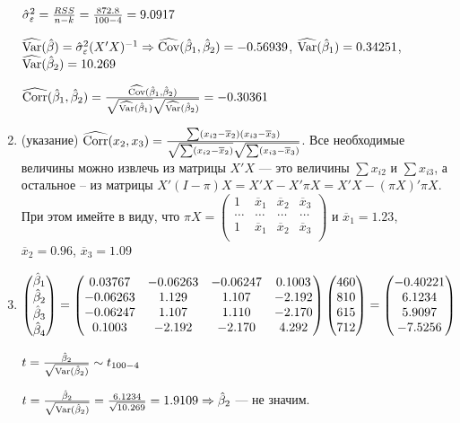 \begin{problem}
\begin{sol}
\begin{enumerate}
$\hat{\sigma}_{\varepsilon}^2 = \frac{RSS}{n-k} = \frac{872.8}{100-4} = 9.0917$

$\widehat{\operatorname{Var}}(\hat{\beta}) = \hat{\sigma}_{\varepsilon}^2 (X' X)^{-1} \Rightarrow \widehat{\operatorname{Cov}}(\hat{\beta}_1, \hat{\beta}_2) = -0.56939$, $\widehat{\operatorname{Var}}(\hat{\beta}_1) = 0.34251$, $\widehat{\operatorname{Var}}(\hat{\beta}_2) = 10.269$

$\widehat{\operatorname{Corr}}(\hat{\beta}_1, \hat{\beta}_2) = \frac{\widehat{\operatorname{Cov}}(\hat{\beta}_1, \hat{\beta}_2)}{\sqrt{\widehat{\operatorname{Var}}(\hat{\beta}_1)}\sqrt{\widehat{\operatorname{Var}}(\hat{\beta}_2)}} = -0.30361$

\item(указание) $\widehat{\operatorname{Corr}}(x_2, x_3) = \frac{\sum (x_{i2} - \overline{x}_2) (x_{i3} - \overline{x}_3)}{\sqrt{\sum (x_{i2} - \overline{x}_2)}\sqrt{\sum (x_{i3} - \overline{x}_3)}}$. Все необходимые величины можно извлечь из матрицы $X' X$ — это величины $\sum x_{i2}$ и $\sum x_{i3}$, а остальное -- из матрицы $X' (I - \pi) X = X' X - X' \pi X = X' X - (\pi X)' \pi X$. При этом имейте в виду, что
$\pi X = \begin{pmatrix}
1 & \overline{x}_1 & \overline{x}_2 & \overline{x}_3 \\
\ldots & \ldots & \ldots & \ldots \\
1 & \overline{x}_1 & \overline{x}_2 & \overline{x}_3 \\
\end{pmatrix}$ и $\overline{x}_1 = 1.23$, $\overline{x}_2 = 0.96$, $\overline{x}_3 = 1.09$

\item $\begin{pmatrix}
\hat{\beta}_1 \\
\hat{\beta}_2 \\
\hat{\beta}_3 \\
\hat{\beta}_4 \\
\end{pmatrix} = \begin{pmatrix}
0.03767 & -0.06263 & -0.06247 & 0.1003 \\
-0.06263 & 1.129 & 1.107 & -2.192 \\
-0.06247 & 1.107 & 1.110 & -2.170 \\
0.1003 & -2.192 & -2.170 & 4.292 \\
\end{pmatrix} \begin{pmatrix}
460\\
810\\
615\\
712\\
\end{pmatrix} = \begin{pmatrix}
-0.40221 \\
6.1234 \\
5.9097 \\
-7.5256 \\
\end{pmatrix}$

$t = \frac{\hat{\beta}_2}{\sqrt{\operatorname{Var}(\hat{\beta}_2)}} \sim t_{100-4}$

$t = \frac{\hat{\beta}_2}{\sqrt{\operatorname{Var}(\hat{\beta}_2)}} = \frac{6.1234}{\sqrt{10.269}} = 1.9109 \Rightarrow \hat{\beta}_2$ — не значим.
\end{enumerate}
\end{sol}
\end{problem}



